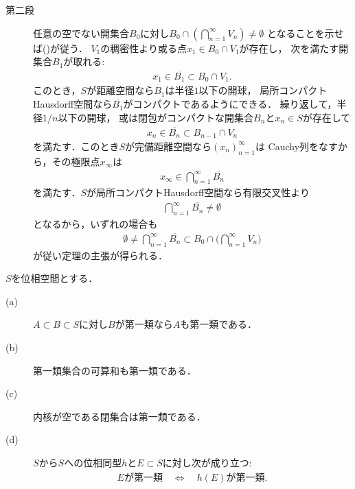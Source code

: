 \begin{prf}
\begin{description}
			\item[第二段]
				任意の空でない開集合$B_0$に対し$B_0 \cap \left( \bigcap_{n=1}^\infty V_n \right) \neq \emptyset$
				となることを示せば()が従う．
				$V_1$の稠密性より或る点$x_1 \in B_0 \cap V_1$が存在し，
				次を満たす開集合$B_1$が取れる:
				\begin{align}
					x_1 \in \overline{B_1} \subset B_0 \cap V_1.
					\label{eq:thm_Baire_category_theorem_2}
				\end{align}
				このとき，$S$が距離空間なら$B_1$は半径$1$以下の開球，
				局所コンパクトHausdorff空間なら$\overline{B_1}$がコンパクトであるようにできる．
				繰り返して，半径$1/n$以下の開球，
				或は閉包がコンパクトな開集合$B_n$と$x_n \in S$が存在して
				\begin{align}
					x_n \in \overline{B_n} \subset B_{n-1} \cap V_n
				\end{align}
				を満たす．このとき$S$が完備距離空間なら$(x_n)_{n=1}^\infty$は
				Cauchy列をなすから，その極限点$x_\infty$は
				\begin{align}
					x_\infty \in \bigcap_{n=1}^\infty \overline{B_n}
				\end{align}
				を満たす．$S$が局所コンパクトHausdorff空間なら有限交叉性より
				\begin{align}
					\bigcap_{n=1}^\infty \overline{B_n} \neq \emptyset
				\end{align}
				となるから，いずれの場合も
				\begin{align}
					\emptyset \neq \bigcap_{n=1}^\infty \overline{B_n} 
					\subset B_0 \cap \Biggl( \bigcap_{n=1}^\infty V_n \Biggr)
				\end{align}
				が従い定理の主張が得られる．
				\QED
		\end{description}
	\end{prf}
	
	\begin{screen}
		\begin{thm}[第一類集合の性質]
			$S$を位相空間とする．
			\begin{description}
				\item[(a)] $A \subset B \subset S$に対し$B$が第一類なら$A$も第一類である．
				\item[(b)] 第一類集合の可算和も第一類である．
				\item[(c)] 内核が空である閉集合は第一類である．
				\item[(d)] $S$から$S$への位相同型$h$と$E \subset S$に対し次が成り立つ:
					\begin{align}
						\mbox{$E$が第一類} \quad \Longleftrightarrow \quad
						\mbox{$h(E)$が第一類}.
					\end{align}
			\end{description}
		\end{thm}
	\end{screen}
	
